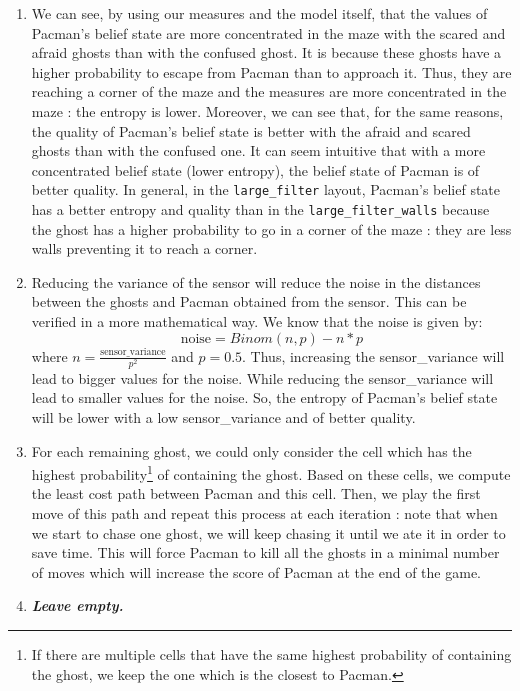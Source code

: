 \documentclass{article}
\begin{document}
\begin{enumerate}[label=\alph*.,leftmargin=*]
    \item We can see, by using our measures and the model itself, that the values of Pacman's belief state are more concentrated in the maze with the scared and afraid ghosts than with the confused ghost. It is because these ghosts have a higher probability to escape from Pacman than to approach it. Thus, they are reaching a corner of the maze and the measures are more concentrated in the maze : the entropy is lower.
    Moreover, we can see that, for the same reasons, the quality of Pacman's belief state is better with the afraid and scared ghosts than with the confused one. It can seem intuitive that with a more concentrated belief state (lower entropy), the belief state of Pacman is of better quality. In general, in the \texttt{large\_filter} layout, Pacman's belief state has a better entropy and quality than in the \texttt{large\_filter\_walls} because the ghost has a higher probability to go in a corner of the maze : they are less walls preventing it to reach a corner.
    \item Reducing the variance of the sensor will reduce the noise in the distances between the ghosts and Pacman obtained from the sensor. This can be verified in a more mathematical way. We know that the noise is given by: $$\text{noise} = Binom(n, p) - n * p$$
    where $n = \frac{\text{sensor\_variance}}{p^2}$ and $p = 0.5$. Thus, increasing the sensor\_variance will lead to bigger values for the noise. While reducing the sensor\_variance will lead to smaller values for the noise. So, the entropy of Pacman's belief state will be lower with a low sensor\_variance and of better quality.
    
    \item For each remaining ghost, we could only consider the cell which has the highest probability\footnote{If there are multiple cells that have the same highest probability of containing the ghost, we keep the one which is the closest to Pacman.} of containing the ghost. Based on these cells, we compute the least cost path between Pacman and this cell. Then, we play the first move of this path and repeat this process at each iteration : note that when we start to chase one ghost, we will keep chasing it until we ate it in order to save time. This will force Pacman to kill all the ghosts in a minimal number of moves which will increase the score of Pacman at the end of the game.
    \item \textbf{\textit{Leave empty.}}
\end{enumerate}

\end{document}
